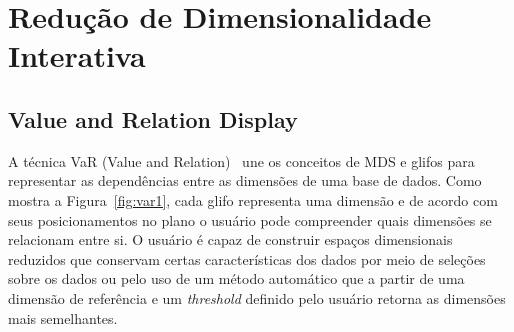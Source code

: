 
\section{Redução de Dimensionalidade Interativa}

\subsection{Value and Relation Display}\label{sec:var}

A técnica VaR (Value and Relation)~\cite{Yang2004} une os conceitos de MDS e glifos para representar as dependências entre as dimensões de uma base de dados. Como mostra a Figura~\ref{fig:var1}, cada glifo representa uma dimensão e de acordo com seus posicionamentos no plano o usuário pode compreender quais dimensões se relacionam entre si. O usuário é capaz de construir espaços dimensionais reduzidos que conservam certas características dos dados por meio de seleções sobre os dados ou pelo uso de um método automático que a partir de uma dimensão de referência e um \emph{threshold} definido pelo usuário retorna as dimensões mais semelhantes.

